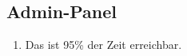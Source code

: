 \subsection{Admin-Panel}

\begin{enumerate}
    \item Das %
        ist 95\% der Zeit erreichbar.
\end{enumerate}